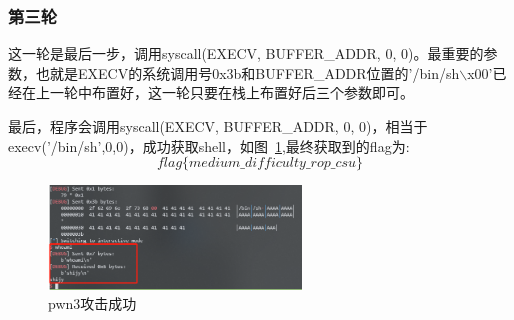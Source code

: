\subsubsection*{第三轮}
这一轮是最后一步，调用syscall(EXECV, BUFFER\_ADDR, 0, 0)。最重要的参数，也就是EXECV的系统调用号0x3b和BUFFER\_ADDR位置的'/bin/sh$\backslash$x00'已经在上一轮中布置好，这一轮只要在栈上布置好后三个参数即可。

最后，程序会调用syscall(EXECV, BUFFER\_ADDR, 0, 0)，相当于execv('/bin/sh',0,0)，成功获取shell，如图~\ref{fig:7},最终获取到的flag为:
$$ flag\{medium\_difficulty\_rop\_csu\} $$
\begin{figure}[H]
    \centering
    \includegraphics[width=0.6\textwidth]{WP/pwn/pic/7.jpg}
    \caption{pwn3攻击成功}
    \label{fig:7}
\end{figure}
